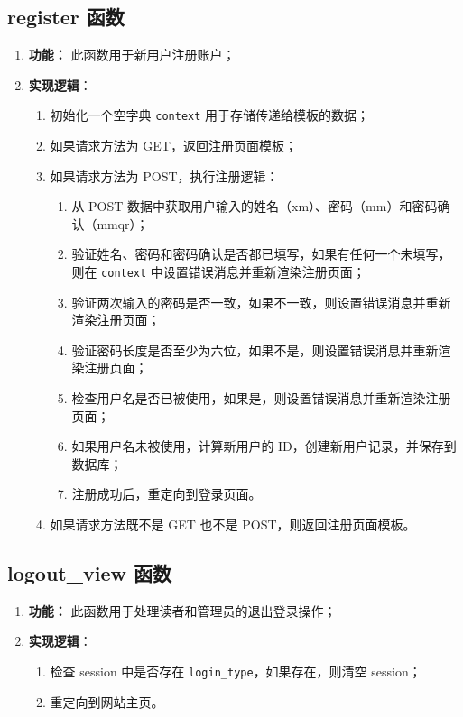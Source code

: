 \documentclass{ctexart}
\begin{document}
    \subsection{register 函数}
\begin{enumerate}
    \item \textbf{功能：} 此函数用于新用户注册账户；
    \item \textbf{实现逻辑}：
    \begin{enumerate}
        \item 初始化一个空字典 \texttt{context} 用于存储传递给模板的数据；
        \item 如果请求方法为 GET，返回注册页面模板；
        \item 如果请求方法为 POST，执行注册逻辑：
        \begin{enumerate}
            \item 从 POST 数据中获取用户输入的姓名（xm）、密码（mm）和密码确认（mmqr）；
            \item 验证姓名、密码和密码确认是否都已填写，如果有任何一个未填写，则在 \texttt{context} 中设置错误消息并重新渲染注册页面；
            \item 验证两次输入的密码是否一致，如果不一致，则设置错误消息并重新渲染注册页面；
            \item 验证密码长度是否至少为六位，如果不是，则设置错误消息并重新渲染注册页面；
            \item 检查用户名是否已被使用，如果是，则设置错误消息并重新渲染注册页面；
            \item 如果用户名未被使用，计算新用户的 ID，创建新用户记录，并保存到数据库；
            \item 注册成功后，重定向到登录页面。
        \end{enumerate}
        \item 如果请求方法既不是 GET 也不是 POST，则返回注册页面模板。
    \end{enumerate}
\end{enumerate}

\subsection{logout\_view 函数}
\begin{enumerate}
    \item \textbf{功能：} 此函数用于处理读者和管理员的退出登录操作；
    \item \textbf{实现逻辑}：
    \begin{enumerate}
        \item 检查 session 中是否存在 \texttt{login\_type}，如果存在，则清空 session；
        \item 重定向到网站主页。
    \end{enumerate}
\end{enumerate}
\end{document}
